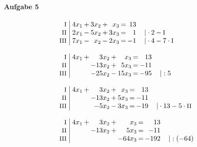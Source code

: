 \paragraph{Aufgabe 5}
\begin{equation*}
\begin{array}{l}
\setlength{\arraycolsep}{1pt}
\begin{array}{r|rcrcrcrl}
    \text{\small I } &\; 4x_{1} & + & 3x_{2} & + &  x_{3} & = & 13 &                                    \\
   \text{\small II } &\; 2x_{1} & - & 5x_{2} & + & 3x_{3} & = &  1 & \quad|\cdot2-\text{\small I}       \\
  \text{\small III } &\; 7x_{1} & - &  x_{2} & - & 2x_{3} & = & -1 & \quad|\cdot4-7\cdot\text{\small I}   
\end{array}
\\ \\
\setlength{\arraycolsep}{1pt}
\begin{array}{r|rcrcrcrl}
    \text{\small I } &\; 4x_{1} & + &   3x_{2} & + &   x_{3} & = &  13 &          \\
   \text{\small II } &\;        &   & -13x_{2} & + &  5x_{3} & = & -11 &          \\
  \text{\small III } &\;        &   & -25x_{2} & - & 15x_{3} & = & -95 & \quad|:5   
\end{array}
\\ \\
\setlength{\arraycolsep}{1pt}
\begin{array}{r|rcrcrcrl}
    \text{\small I } &\; 4x_{1} & + &   3x_{2} & + &  x_{3} & = &  13 &                                      \\
   \text{\small II } &\;        &   & -13x_{2} & + & 5x_{3} & = & -11 &                                      \\
  \text{\small III } &\;        &   &  -5x_{2} & - & 3x_{3} & = & -19 & \quad|\cdot13-5\cdot\text{\small II}   
\end{array}
\\ \\
\setlength{\arraycolsep}{1pt}
\begin{array}{r|rcrcrcrl}
    \text{\small I } &\; 4x_{1} & + &   3x_{2} & + &    x_{3} & = &   13 &              \\
   \text{\small II } &\;        &   & -13x_{2} & + &   5x_{3} & = &  -11 &              \\
  \text{\small III } &\;        &   &          &   & -64x_{3} & = & -192 & \quad|:(-64)   

\end{array}
\end{array}
\end{equation*}
